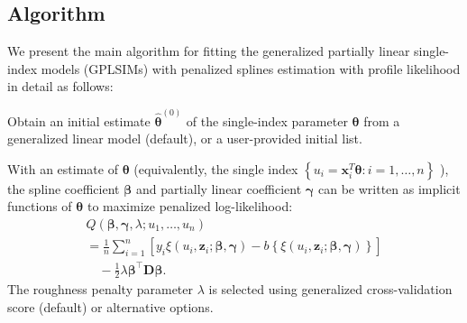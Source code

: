 \subsection{Algorithm}

We present the main algorithm for fitting the generalized partially linear single-index models (GPLSIMs) with penalized splines estimation with profile likelihood in detail as follows: 

\begin{algorithm}[H]  

  Obtain an initial estimate $\hat{\boldsymbol{\theta}}^{(0)}$ of the single-index parameter $\boldsymbol{\theta}$ from a generalized linear model (default), or a user-provided initial list.

  With an estimate of ${\boldsymbol{\theta}}$ (equivalently, the single index $\left\{u_{i}=\mathbf{x}^{T}_{i} {\boldsymbol{\theta}}: i=1, \ldots, n\right\}$ ), the spline coefficient ${\boldsymbol{\beta}}$ and partially linear coefficient ${\boldsymbol{\gamma}}$ can be written as implicit functions of ${\boldsymbol{\theta}}$ to maximize penalized log-likelihood:
  \begin{equation*}\begin{array}{l}
    Q\left(\boldsymbol{\beta}, \boldsymbol{\gamma}, \lambda ; u_{1}, \ldots, u_{n}\right) \\
    =\frac{1}{n} \sum_{i=1}^{n}\left[y_{i} \xi\left(u_{i}, \mathbf{z}_{i} ; \boldsymbol{\beta}, \boldsymbol{\gamma}\right)-b\left\{\xi\left(u_{i}, \mathbf{z}_{i} ; \boldsymbol{\beta}, \boldsymbol{\gamma}\right)\right\}\right] \\
    \quad-\frac{1}{2} \lambda \boldsymbol{\beta}^{\top} \mathbf{D} \boldsymbol{\beta}.
    \end{array}\end{equation*}
   The roughness penalty parameter $\lambda$ is selected using generalized cross-validation score (default) or alternative options.


\end{algorithm}
